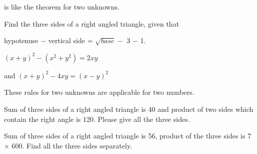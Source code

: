 \documentclass[]{article}
\begin{document}
{{}

{is like the theorem for two unknowns.}

\begin{quote}  {
}  \end{quote}

Find the three sides of a right angled triangle, given that

hypotenuse $-$ vertical side = $\sqrt{base} -$ 3 $-$ 1.

\begin{quote}  {
}  \end{quote}

\hspace{6mm} $( x + y )^{2} - (x^{2} +y^{2}) = 2xy$}

{and $( x + y )^{2} - 4xy = (x - y)^{2}$}

{These rules for two unknowns are applicable for two numbers.}

\begin{quote}  {
}  \end{quote}

{Sum of three sides of a right angled triangle is 40 and product of two
sides which contain the right angle is 120. Please give all the three
sides.}

\begin{quote}  {
}  \end{quote}

{Sum of three sides of a right angled triangle is 56, product of the
three sides is 7 $\times$ 600. Find all the three sides separately.\\
}
\newpage
\large
\end{document}
